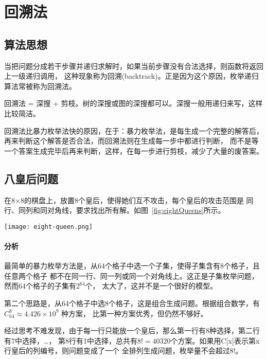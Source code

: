 \chapter{回溯法}

\section{算法思想} %

当把问题分成若干步骤并递归求解时，如果当前步骤没有合法选择，则函数将返回上一级递归调用，
这种现象称为回溯(backtrack)。正是因为这个原因，枚举递归算法常被称为回溯法。

回溯法 = 深搜 + 剪枝。树的深搜或图的深搜都可以。深搜一般用递归来写，这样比较简洁。

回溯法比暴力枚举法快的原因，在于：暴力枚举法，是每生成一个完整的解答后，
再来判断这个解答是否合法，而回溯法则在生成每一步中都进行判断，
而不是等一个答案生成完毕后再来判断，这样，在每一步进行剪枝，减少了大量的废答案。

\section{八皇后问题} %

在8×8的棋盘上，放置8个皇后，使得她们互不攻击，每个皇后的攻击范围是
同行、同列和同对角线，要求找出所有解。如图~\ref{fig:eightQueens}所示。

\begin{center}
\texttt{[image: eight-queen.png]} \\
\label{fig:eightQueens}
\end{center}

\subsubsection{分析}
最简单的暴力枚举方法是，从64个格子中选一个子集，使得子集含有8个格子，且任意两个格子
都不在同一行、同一列或同一个对角线上。这正是子集枚举问题，然而64个格子的子集有$2^{64}$个，
太大了，这并不是一个很好的模型。

第二个思路是，从64个格子中选8个格子，这是组合生成问题。根据组合数学，有 $C_{64}^{8} \approx 4.426 \times 10^9$ 种方案，
比第一种方案优秀，但仍然不够好。

经过思考不难发现，由于每一行只能放一个皇后，那么第一行有8种选择，第二行有7中选择，…，
第8行有1中选择，总共有$8!=40320$个方案。如果用C[x]表示第x行皇后的列编号，则问题变成了一个
全排列生成问题，枚举量不会超过8!。

